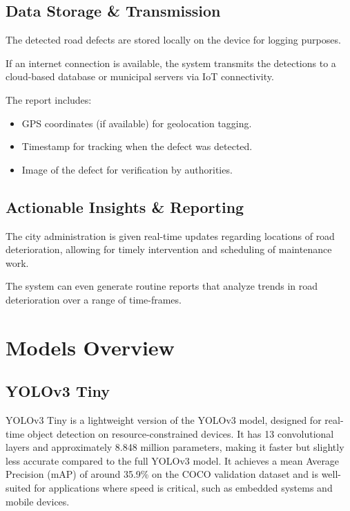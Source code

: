  \subsection{Data Storage \& Transmission}

The detected road defects are stored locally on the device for logging purposes.

\noindent If an internet connection is available, the system transmits the detections to a cloud-based database or municipal servers via IoT connectivity.

The report includes:
\begin{itemize}
    \item GPS coordinates (if available) for geolocation tagging.
    \item Timestamp for tracking when the defect was detected.
    \item Image of the defect for verification by authorities.
\end{itemize}

\subsection{Actionable Insights \& Reporting}

The city administration is given real-time updates regarding locations of road deterioration, allowing for timely intervention and scheduling of maintenance work.

The system can even generate routine reports that analyze trends in road deterioration over a range of time-frames.

\section{Models Overview}

\subsection{YOLOv3 Tiny}
YOLOv3 Tiny is a lightweight version of the YOLOv3 model, designed for real-time object detection on resource-constrained devices. It has 13 convolutional layers and approximately 8.848 million parameters, making it faster but slightly less accurate compared to the full YOLOv3 model. It achieves a mean Average Precision (mAP) of around 35.9\% on the COCO validation dataset and is well-suited for applications where speed is critical, such as embedded systems and mobile devices.\cite{redmon2018yolov3}

